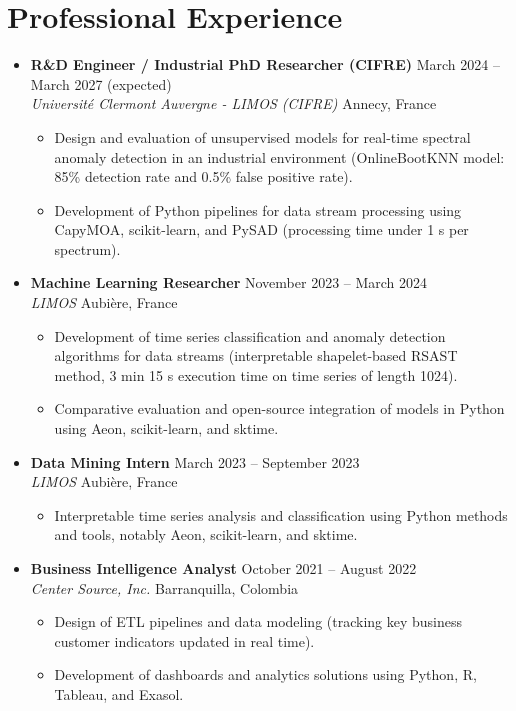 \documentclass[12pt,a4paper]{article}
\begin{document}
\section*{Professional Experience}
\begin{itemize}
\item \textbf{R\&D Engineer / Industrial PhD Researcher (CIFRE)} \hfill March 2024 -- March 2027 (expected)\\
\textit{Université Clermont Auvergne - LIMOS (CIFRE)} \hfill Annecy, France
\begin{itemize}
\item Design and evaluation of unsupervised models for real-time spectral anomaly detection in an industrial environment (OnlineBootKNN model: 85\% detection rate and 0.5\% false positive rate).
\item Development of Python pipelines for data stream processing using CapyMOA, scikit-learn, and PySAD (processing time under 1 s per spectrum).
\end{itemize}

\item \textbf{Machine Learning Researcher} \hfill November 2023 -- March 2024\\
\textit{LIMOS} \hfill Aubière, France
\begin{itemize}
\item Development of time series classification and anomaly detection algorithms for data streams (interpretable shapelet-based RSAST method, 3 min 15 s execution time on time series of length 1024).
\item Comparative evaluation and open-source integration of models in Python using Aeon, scikit-learn, and sktime.
\end{itemize}

\item \textbf{Data Mining Intern} \hfill March 2023 -- September 2023\\
\textit{LIMOS} \hfill Aubière, France
\begin{itemize}
\item Interpretable time series analysis and classification using Python methods and tools, notably Aeon, scikit-learn, and sktime.
\end{itemize}

\item \textbf{Business Intelligence Analyst} \hfill October 2021 -- August 2022\\
\textit{Center Source, Inc.} \hfill Barranquilla, Colombia
\begin{itemize}
\item Design of ETL pipelines and data modeling (tracking key business customer indicators updated in real time).
\item Development of dashboards and analytics solutions using Python, R, Tableau, and Exasol.
\end{itemize}


\end{itemize}
\end{document}

